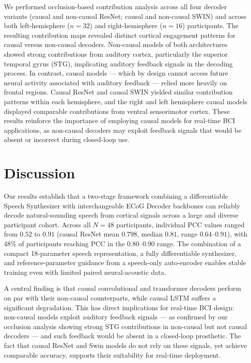 \documentclass[10pt]{article}
\begin{document}
We performed occlusion-based contribution analysis across all four decoder variants (causal and non-causal ResNet; causal and non-causal SWIN) and across both left-hemisphere ($n=32$) and right-hemisphere ($n=16$) participants. The resulting contribution maps revealed distinct cortical engagement patterns for causal versus non-causal decoders. Non-causal models of both architectures showed strong contributions from auditory cortex, particularly the superior temporal gyrus (STG), implicating auditory feedback signals in the decoding process. In contrast, causal models --- which by design cannot access future neural activity associated with auditory feedback --- relied more heavily on frontal regions. Causal ResNet and causal SWIN yielded similar contribution patterns within each hemisphere, and the right and left hemisphere causal models displayed comparable contributions from ventral sensorimotor cortex. These results reinforce the importance of employing causal models for real-time BCI applications, as non-causal decoders may exploit feedback signals that would be absent or incorrect during closed-loop use.

\section{Discussion}

Our results establish that a two-stage framework combining a differentiable Speech Synthesizer with interchangeable ECoG Decoder backbones can reliably decode natural-sounding speech from cortical signals across a large and diverse participant cohort. Across all $N=48$ participants, individual PCC values ranged from $0.52$ to $0.91$ (causal ResNet mean $0.798$, median $0.81$, range $0.64$--$0.91$), with 48\% of participants reaching PCC in the $0.80$--$0.90$ range. The combination of a compact 18-parameter speech representation, a fully differentiable synthesizer, and reference-parameter guidance from a speech-only auto-encoder enables stable training even with limited paired neural-acoustic data.

A central finding is that causal convolutional and transformer decoders perform on par with their non-causal counterparts, while causal LSTM suffers a significant degradation. This has direct implications for real-time BCI design: non-causal models exploit auditory feedback signals --- as confirmed by our occlusion analysis showing strong STG contributions in non-causal but not causal decoders --- and such feedback would be absent in a closed-loop prosthetic. The fact that causal ResNet and Swin models do not rely on these signals, yet achieve comparable accuracy, supports their suitability for real-time deployment.
\end{document}
